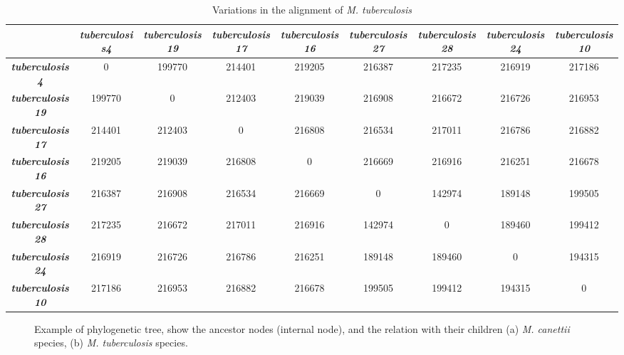 \documentclass[runningheads,a4paper]{llncs}
\begin{document}
\begin{table}[!htb]
\tiny
\centering
\caption{Variations in the alignment of \textit{M. tuberculosis}}
\label{polymorphism_tuberculosis}
\begin{tabular}{|c|c|c|c|c|c|c|c|c|}
\hline
\textit{\textbf{}} & \textit{\textbf{tuberculosis4}} & \textit{\textbf{tuberculosis19}} & \textit{\textbf{tuberculosis17}} & \textit{\textbf{\textit{tuberculosis16}}} & \textit{\textbf{tuberculosis27}} & \textit{\textbf{tuberculosis28}} & \textit{\textbf{tuberculosis24}} & \textit{\textbf{tuberculosis10}}\\ \hline
\textit{\textbf{tuberculosis4}} &0&199770&214401&219205&216387&217235&216919&217186\\ \hline
\textit{\textbf{tuberculosis19}} &199770&0&212403&219039&216908&216672&216726&216953\\ \hline
\textit{\textbf{tuberculosis17}} &214401&212403&0&216808&216534&217011&216786&216882 \\ \hline
\textit{\textbf{tuberculosis16}}&219205&219039&216808&0&216669&216916&216251&216678  \\ \hline
\textit{\textbf{tuberculosis27}} &216387&216908&216534&216669&0&142974&189148&199505  \\ \hline
\textit{\textbf{tuberculosis28}} &217235&216672&217011&216916&142974&0&189460&199412   \\ \hline
\textit{\textbf{tuberculosis24}} &216919&216726&216786&216251&189148&189460&0&194315   \\ \hline
\textit{\textbf{tuberculosis10}} &217186&216953&216882&216678&199505&199412&194315&0   \\ \hline
\end{tabular}
\end{table}




\begin{figure}[!htb]
\begin{minipage}{.5\linewidth}
\centering
{}
\end{minipage}%
\begin{minipage}{.5\linewidth}
\centering
{}
\end{minipage}\par\medskip
\centering
\caption{Example of phylogenetic tree, show the ancestor nodes (internal node), and the relation with their children (a) \textit{M. canettii} species, (b) \textit{M. tuberculosis} species.}
\label{fig:Ancestor_tree}
\end{figure}
\end{document}
